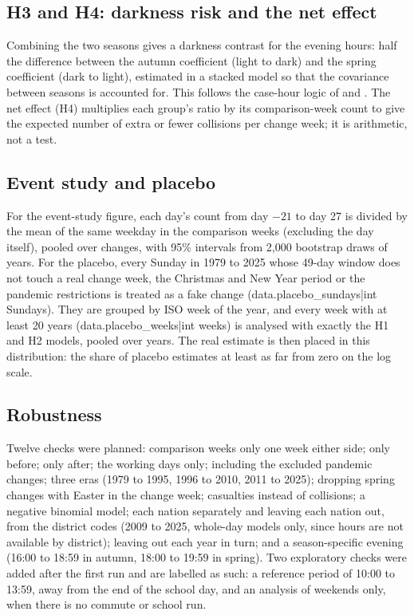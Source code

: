 \documentclass[11pt,a4paper]{article}
\begin{document}
\subsection{H3 and H4: darkness risk and the net effect}
Combining the two seasons gives a darkness contrast for the evening hours: half the difference between the autumn coefficient (light to dark) and the spring coefficient (dark to light), estimated in a stacked model so that the covariance between seasons is accounted for. This follows the case-hour logic of \citet{johansson2009} and \citet{sullivan2002}. The net effect (H4) multiplies each group's ratio by its comparison-week count to give the expected number of extra or fewer collisions per change week; it is arithmetic, not a test.

\subsection{Event study and placebo}
For the event-study figure, each day's count from day $-21$ to day 27 is divided by the mean of the same weekday in the comparison weeks (excluding the day itself), pooled over changes, with 95\% intervals from 2,000 bootstrap draws of years. For the placebo, every Sunday in 1979 to 2025 whose 49-day window does not touch a real change week, the Christmas and New Year period or the pandemic restrictions is treated as a fake change ({{data.placebo_sundays|int}} Sundays). They are grouped by ISO week of the year, and every week with at least 20 years ({{data.placebo_weeks|int}} weeks) is analysed with exactly the H1 and H2 models, pooled over years. The real estimate is then placed in this distribution: the share of placebo estimates at least as far from zero on the log scale.

\subsection{Robustness}
Twelve checks were planned: comparison weeks only one week either side; only before; only after; the working days only; including the excluded pandemic changes; three eras (1979 to 1995, 1996 to 2010, 2011 to 2025); dropping spring changes with Easter in the change week; casualties instead of collisions; a negative binomial model; each nation separately and leaving each nation out, from the district codes (2009 to 2025, whole-day models only, since hours are not available by district); leaving out each year in turn; and a season-specific evening (16:00 to 18:59 in autumn, 18:00 to 19:59 in spring). Two exploratory checks were added after the first run and are labelled as such: a reference period of 10:00 to 13:59, away from the end of the school day, and an analysis of weekends only, when there is no commute or school run.
\end{document}
